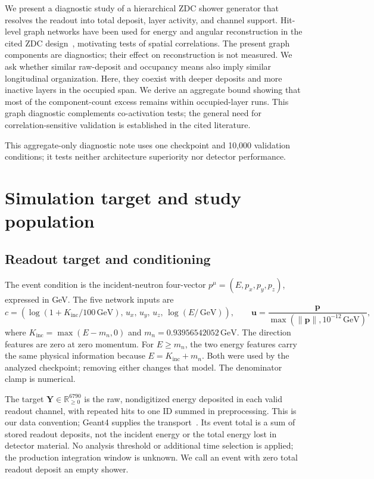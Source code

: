 \documentclass[11pt]{article}
\newcommand{\GeV}{\,\mathrm{GeV}}
\newcommand{\Kinc}{K_{\mathrm{inc}}}
\newcommand{\Y}{\mathbf{Y}}
\begin{document}
We present a diagnostic study of a hierarchical ZDC shower generator that resolves the readout into total deposit, layer activity, and channel support. Hit-level graph networks have been used for energy and angular reconstruction in the cited ZDC design~\cite{epiczdc}, motivating tests of spatial correlations. The present graph components are diagnostics; their effect on reconstruction is not measured. We ask whether similar raw-deposit and occupancy means also imply similar longitudinal organization. Here, they coexist with deeper deposits and more inactive layers in the occupied span. We derive an aggregate bound showing that most of the component-count excess remains within occupied-layer runs. This graph diagnostic complements co-activation tests; the general need for correlation-sensitive validation is established in the cited literature.

This aggregate-only diagnostic note uses one checkpoint and 10,000 validation conditions; it tests neither architecture superiority nor detector performance.

\section{Simulation target and study population}
\label{sec:data}

\subsection{Readout target and conditioning}

The event condition is the incident-neutron four-vector $p^\mu=(E,p_x,p_y,p_z)$, expressed in GeV. The five network inputs are
\begin{equation}
 c=\left(\log(1+\Kinc/100\GeV),\,u_x,\,u_y,\,u_z,\,\log(E/\GeV)\right),
 \qquad \mathbf u=\frac{\mathbf p}{\max(\lVert\mathbf p\rVert,10^{-12}\GeV)},
 \label{eq:condition}
\end{equation}
where $\Kinc=\max(E-m_n,0)$ and $m_n=0.93956542052\GeV$. The direction features are zero at zero momentum. For $E\geq m_n$, the two energy features carry the same physical information because $E=\Kinc+m_n$. Both were used by the analyzed checkpoint; removing either changes that model. The denominator clamp is numerical.

The target $\Y\in\mathbb R_{\geq0}^{6790}$ is the raw, nondigitized energy deposited in each valid readout channel, with repeated hits to one ID summed in preprocessing. This is our data convention; Geant4 supplies the transport~\cite{geant4}. Its event total is a sum of stored readout deposits, not the incident energy or the total energy lost in detector material. No analysis threshold or additional time selection is applied; the production integration window is unknown. We call an event with zero total readout deposit an empty shower.
\end{document}
